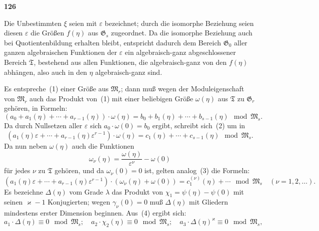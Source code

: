 \documentclass[12pt,a4paper]{article}
\begin{document}
\newpage
\begin{center}
\textbf{126}
\end{center}

Die Unbestimmten $\xi$ seien mit $\varepsilon$ bezeichnet; durch die isomorphe Beziehung seien diesen $\varepsilon$ die Gr\"o\ss en $f(\eta)$ aus $\mathfrak{G}_s$ zugeordnet. Da die isomorphe Beziehung auch bei Quotientenbildung erhalten bleibt, entspricht dadurch dem Bereich $\mathfrak{G}_0$ aller ganzen algebraischen Funktionen der $\varepsilon$ ein algebraisch-ganz abgeschlossener Bereich $\mathfrak{T}$, bestehend aus allen Funktionen, die algebraisch-ganz von den $f(\eta)$ abh\"angen, also auch in den $\eta$ algebraisch-ganz sind.

Es entspreche~(1) einer Gr\"o\ss e aus $\mathfrak{M}_r$; dann mu\ss{} wegen der Moduleigenschaft von $\mathfrak{M}_r$ auch das Produkt von~(1) mit einer beliebigen Gr\"o\ss e $\omega(\eta)$ aus $\mathfrak{T}$ zu $\mathfrak{G}_r$ geh\"oren, in Formeln:
\begin{equation}\tag{2}
(a_0 + a_1(\eta) + \cdots + a_{r-1}(\eta)) \cdot \omega(\eta) = b_0 + b_1(\eta) + \cdots + b_{s-1}(\eta) \mod \mathfrak{M}_s.\end{equation}
Da durch Nullsetzen aller $\varepsilon$ sich $a_0 \cdot \omega(0) = b_0$ ergibt, schreibt sich~(2) um in
\begin{equation}\tag{3}
(a_1(\eta) \varepsilon + \cdots + a_{r-1}(\eta) \varepsilon^{r-1}) \cdot \omega(\eta) = c_1(\eta) + \cdots + c_{s-1}(\eta) \mod \mathfrak{M}_s.\end{equation}
Da nun neben $\omega(\eta)$ auch die Funktionen
\[\omega_{\nu}(\eta) = \frac{\omega(\eta)}{\varepsilon^{\nu}} - \omega(0)\]
f\"ur jedes $\nu$ zu $\mathfrak{T}$ geh\"oren, und da $\omega_{\nu}(0) = 0$ ist, gelten analog~(3) die Formeln:
\begin{equation}\tag{4}
(a_1(\eta) \varepsilon + \cdots + a_{r-1}(\eta) \varepsilon^{r-1}) \cdot (\omega_{\nu}(\eta) + \omega(0)) = c_1^{(\nu)}(\eta) + \cdots \mod \mathfrak{M}_s \quad (\nu = 1, 2, \ldots).\end{equation}
Es bezeichne $\Delta(\eta)$ vom Grade $\lambda$ das Produkt von $\chi_1 = \psi(\eta) - \psi(0)$ mit seinen $\varkappa-1$ Konjugierten; wegen $\gamma_{\nu}(0) = 0$ mu\ss{} $\Delta(\eta)$ mit Gliedern mindestens erster Dimension beginnen. Aus~(4) ergibt sich:
\begin{equation}\tag{5}
a_1 \cdot \Delta(\eta) \equiv 0 \mod \mathfrak{M}_s; \quad a_2 \cdot \chi_2(\eta) \equiv 0 \mod \mathfrak{M}_s; \quad a_3 \cdot \Delta(\eta)^{\varkappa} \equiv 0 \mod \mathfrak{M}_s,\end{equation}
\end{document}
